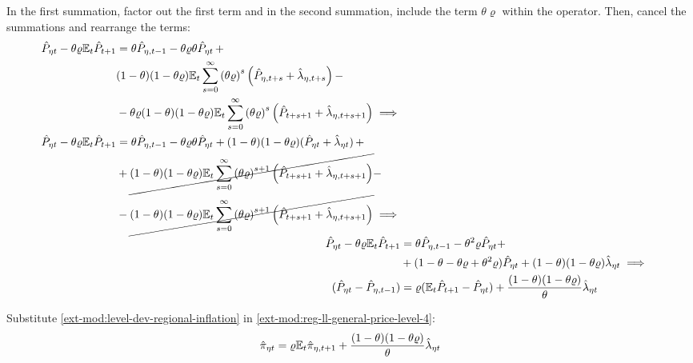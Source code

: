 \documentclass[../thesis.tex]{subfiles}
\begin{document}
In the first summation, factor out the first term and in the second summation, include the term $\theta \varrho$ within the operator. Then, cancel the summations and rearrange the terms:
\begin{align}
	\begin{split}
		\hat{P}_{\eta t} - \theta \varrho {\mathbb{E}_{t}} \hat{P}_{t+1} &= \theta \hat{P}_{\eta, t-1} - \theta \varrho \theta \hat{P}_{\eta t} \, + \\
		& (1-\theta) (1- \theta \varrho) {\mathbb{E}_{t}} \sum_{s=0}^{\infty} \left( \theta \varrho \right)^s \left( \hat{P}_{\eta, t+s} + \hat{\lambda}_{\eta, t+s} \right) -
		\\
		& - \theta \varrho (1-\theta) (1- \theta \varrho) {\mathbb{E}_{t}} \sum_{s=0}^{\infty} \left( \theta \varrho \right)^s \left( \hat{P}_{t+s+1} + \hat{\lambda}_{\eta, t+s+1} \right) \implies \nonumber 
	\end{split} \\
	\begin{split}
		\hat{P}_{\eta t} - \theta \varrho {\mathbb{E}_{t}} \hat{P}_{t+1} &= \theta \hat{P}_{\eta, t-1} - \theta \varrho \theta \hat{P}_{\eta t} + (1-\theta) (1- \theta \varrho) (\hat{P}_{\eta t} + \hat{\lambda}_{\eta t}) \, + 
		\\
		& + \cancel{(1-\theta) (1- \theta \varrho) {\mathbb{E}_{t}} \sum_{s=0}^{\infty} \left( \theta \varrho \right)^{s+1} \left( \hat{P}_{t+s+1} + \hat{\lambda}_{\eta, t+s+1} \right)} -
		\\
		& - \cancel{(1-\theta) (1- \theta \varrho) {\mathbb{E}_{t}} \sum_{s=0}^{\infty} \left( \theta \varrho \right)^{s+1} \left( \hat{P}_{t+s+1} + \hat{\lambda}_{\eta, t+s+1} \right)} \implies \nonumber 
	\end{split} \\
	\hat{P}_{\eta t} - \theta \varrho {\mathbb{E}_{t}} \hat{P}_{t+1} &= \theta \hat{P}_{\eta, t-1} - \theta^2 \varrho \hat{P}_{\eta t} + \nonumber \\
	& + (1- \theta -\theta \varrho + \theta^2 \varrho) \hat{P}_{\eta t} + (1-\theta) (1- \theta \varrho) \hat{\lambda}_{\eta t} \implies \nonumber \\
	(\hat{P}_{\eta t} - \hat{P}_{\eta, t-1}) &= \varrho ({\mathbb{E}_{t}} \hat{P}_{t+1} - \hat{P}_{\eta t}) + \frac{(1-\theta) (1- \theta \varrho)}{\theta} \hat{\lambda}_{\eta t}
	\label{ext-mod:reg-ll-general-price-level-4}
\end{align}

Substitute \ref{ext-mod:level-dev-regional-inflation} in \ref{ext-mod:reg-ll-general-price-level-4}:
\begin{align}
	\hat{\pi}_{\eta t} = \varrho {\mathbb{E}_{t}} \hat{\pi}_{\eta, t+1} + \frac{(1-\theta) (1- \theta \varrho)}{\theta} \hat{\lambda}_{\eta t} \label{ext-mod:reg-nk-phillips-curve-mc}
\end{align}
\end{document}
